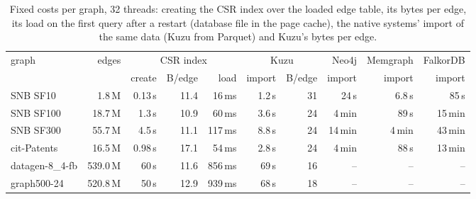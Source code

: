 \begin{table}[t]\centering\scriptsize\setlength{\tabcolsep}{1.6pt}
\caption{Fixed costs per graph, 32 threads: creating the CSR index over the loaded edge table, its bytes per edge, its load on the first query after a restart (database file in the page cache), the native systems' import of the same data (Kuzu from Parquet) and Kuzu's bytes per edge.}\label{tab:fixed-costs}
\begin{tabular}{lrrrrrrrrr}\toprule
graph & edges & \multicolumn{3}{c}{CSR index} & \multicolumn{2}{c}{Kuzu} & Neo4j & Memgraph & FalkorDB \\
 & & create & B/edge & load & import & B/edge & import & import & import \\ \midrule
SNB SF10 & 1.8\,M & 0.13\,s & 11.4 & 16\,ms & 1.2\,s & 31 & 24\,s & 6.8\,s & 85\,s \\
SNB SF100 & 18.7\,M & 1.3\,s & 10.9 & 60\,ms & 3.6\,s & 24 & 4\,min & 89\,s & 15\,min \\
SNB SF300 & 55.7\,M & 4.5\,s & 11.1 & 117\,ms & 8.8\,s & 24 & 14\,min & 4\,min & 43\,min \\
cit-Patents & 16.5\,M & 0.98\,s & 17.1 & 54\,ms & 2.8\,s & 24 & 4\,min & 88\,s & 13\,min \\
datagen-8\_4-fb & 539.0\,M & 60\,s & 11.6 & 856\,ms & 69\,s & 16 & -- & -- & -- \\
graph500-24 & 520.8\,M & 50\,s & 12.9 & 939\,ms & 68\,s & 18 & -- & -- & -- \\
\bottomrule\end{tabular}\end{table}
